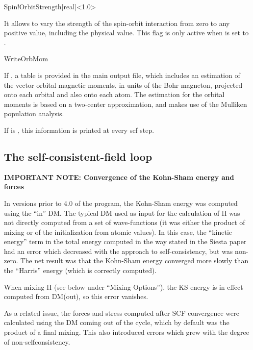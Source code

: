 \begin{fdfentry}{Spin!OrbitStrength}[real]<1.0>

  It allows to vary the strength of the spin-orbit interaction from
  zero to any positive value, including the physical value. This flag
  is only active when  is set to .

\end{fdfentry}

\begin{fdflogicalF}{WriteOrbMom}

  If \fdftrue, a table is provided in the main output file, which
  includes an estimation of the vector orbital magnetic
  moments, in units of the Bohr magneton, projected onto each orbital
  and also onto each atom. The estimation for the orbital moments is
  based on a two-center approximation, and makes use of the Mulliken
  population analysis.

  If  is \fdftrue, this information is printed at
  every scf step.

\end{fdflogicalF}


\subsection{The self-consistent-field loop}

\textbf{IMPORTANT NOTE: Convergence of the Kohn-Sham energy and forces}

In versions prior to 4.0 of the program, the Kohn-Sham energy was computed
using the ``in'' DM. The typical DM used as input for the calculation
of H was not directly computed from a set of wave-functions (it was
either the product of mixing or of the initialization from atomic
values). In this case, the ``kinetic energy'' term in the total energy
computed in the way stated in the Siesta paper had an error which
decreased with the approach to self-consistency, but was non-zero. The
net result was that the Kohn-Sham energy converged more slowly than
the ``Harris'' energy (which is correctly computed).

When mixing H (see below under ``Mixing Options''), the KS energy is
in effect computed from DM(out), so this error vanishes.

As a related issue, the forces and stress computed after SCF
convergence were calculated using the DM coming out of the cycle,
which by default was the product of a final mixing. This also
introduced errors which grew with the degree of non-selfconsistency.

